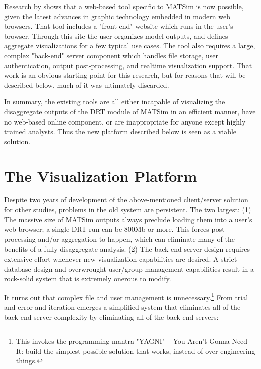 \documentclass[3p,times,procedia]{elsarticle}
\begin{document}
Research by \citet{CharltonLaudan2020WebBasedVisualization} shows that a web-based tool specific to MATSim is now possible, given the latest advances in graphic technology embedded in modern web browsers. That tool includes a "front-end" website which runs in the user's browser. Through this site the user organizes model outputs, and defines aggregate visualizations for a few typical use cases. The tool also requires a large, complex "back-end" server component which handles file storage, user authentication, output post-processing, and realtime visualization support. That work is an obvious starting point for this research, but for reasons that will be described below, much of it was ultimately discarded.

In summary, the existing tools are all either incapable of visualizing the disaggregate outputs of the DRT module of MATSim in an efficient manner, have no web-based online component, or are inappropriate for anyone except highly trained analysts. Thus the new platform described below is seen as a viable solution.

\section{The Visualization Platform}
\label{platform}

Despite two years of development of the above-mentioned client/server solution for other studies, problems in the old system are persistent. The two largest: (1) The massive size of MATSim outputs always preclude loading them into a user's web browser; a single DRT run can be 800Mb or more. This forces post-processing and/or aggregation to happen, which can eliminate many of the benefits of a fully disaggregate analysis. (2) The back-end server design requires extensive effort whenever new visualization capabilities are desired. A strict database design and overwrought user/group management capabilities result in a rock-solid system that is extremely onerous to modify.

It turns out that complex file and user management is unnecessary.\footnote{This invokes the programming mantra "YAGNI" -- You Aren't Gonna Need It: build the simplest possible solution that works, instead of over-engineering things.} From trial and error and iteration emerges a simplified system that eliminates all of the back-end server complexity by eliminating all of the back-end servers:
\end{document}
